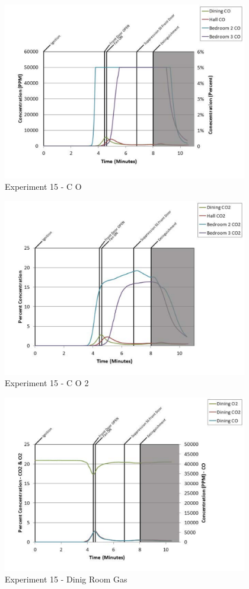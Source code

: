 \documentclass{article}
\begin{document}
\begin{appendices}
	\clearpage

	\begin{figure}[h!]
		\centering
		\includegraphics[height=3.05in]{0_Images/Results_Charts/Exp_15_Charts/CO.pdf}
		\caption{Experiment 15 - C O}
	\end{figure}
 

	\begin{figure}[h!]
		\centering
		\includegraphics[height=3.05in]{0_Images/Results_Charts/Exp_15_Charts/CO2.pdf}
		\caption{Experiment 15 - C O 2}
	\end{figure}
 
	\clearpage

	\begin{figure}[h!]
		\centering
		\includegraphics[height=3.05in]{0_Images/Results_Charts/Exp_15_Charts/DinigRoomGas.pdf}
		\caption{Experiment 15 - Dinig Room Gas}
	\end{figure}
 


\end{appendices}
\end{document}
